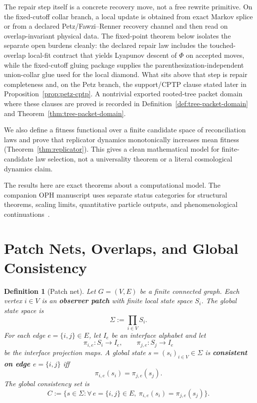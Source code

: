 \documentclass[11pt]{article}
\newtheorem{definition}[theorem]{Definition}
\theoremstyle{remark}
\theoremstyle{plain}
\begin{document}
The repair step itself is a concrete recovery move, not a free rewrite primitive. On the
fixed-cutoff collar branch, a local update is obtained from exact Markov splice or from a
declared Petz/Fawzi--Renner recovery channel and then read on overlap-invariant physical data.
The fixed-point theorem below isolates the separate open burdens cleanly: the declared
repair law includes the touched-overlap local-fit contract that yields Lyapunov descent of
\(\Phi\) on accepted moves, while the fixed-cutoff gluing package supplies the
parenthesization-independent union-collar glue used for the local diamond. What sits above
that step is repair completeness and, on the Petz branch, the support/CPTP clause stated later in
Proposition~\ref{prop:petz-cptp}.
A nontrivial exported rooted-tree packet domain where these clauses are proved is recorded in
Definition~\ref{def:tree-packet-domain} and Theorem~\ref{thm:tree-packet-domain}.

We also define a fitness functional over a finite candidate space of reconciliation laws and prove
that replicator dynamics monotonically increases mean fitness (Theorem~\ref{thm:replicator}). This
gives a clean mathematical model for finite-candidate law selection, not a universality theorem or
a literal cosmological dynamics claim.

The results here are exact theorems about a computational model. The companion
OPH manuscript uses separate status categories for structural theorems, scaling
limits, quantitative particle outputs, and phenomenological
continuations~\cite{OPH}.


\section{Patch Nets, Overlaps, and Global Consistency}

\begin{definition}[Patch net]\label{def:patchnet}
Let $G=(V,E)$ be a finite connected graph. Each vertex $i\in V$ is an \textbf{observer patch} with finite local state space $S_i$. The global state space is
\[
\Sigma := \prod_{i\in V} S_i.
\]
For each edge $e=\{i,j\}\in E$, let $I_e$ be an interface alphabet and let
\[
\pi_{i,e}:S_i\to I_e,
\qquad
\pi_{j,e}:S_j\to I_e
\]
be the interface projection maps. A global state $s=(s_i)_{i\in V}\in\Sigma$ is \textbf{consistent on edge $e=\{i,j\}$} iff
\[
\pi_{i,e}(s_i)=\pi_{j,e}(s_j).
\]
The global consistency set is
\[
C:=\bigl\{s\in\Sigma:\forall\, e=\{i,j\}\in E,\ \pi_{i,e}(s_i)=\pi_{j,e}(s_j)\bigr\}.
\]
\end{definition}
\end{document}
